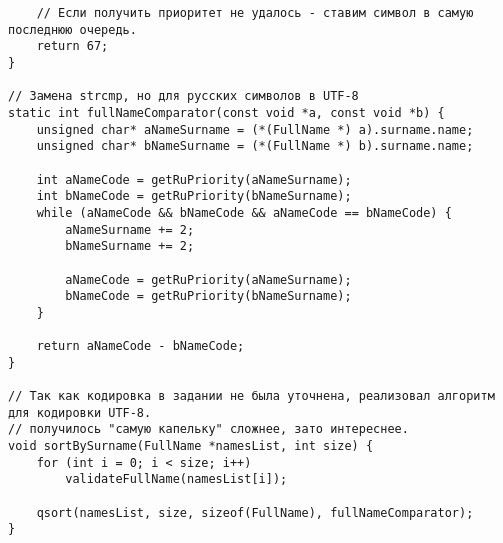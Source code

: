 \documentclass[a4paper, 12pt, oneside]{article}
\begin{document}
\begin{verbatim}
    // Если получить приоритет не удалось - ставим символ в самую последнюю очередь.
    return 67;
}

// Замена strcmp, но для русских символов в UTF-8
static int fullNameComparator(const void *a, const void *b) {
    unsigned char* aNameSurname = (*(FullName *) a).surname.name;
    unsigned char* bNameSurname = (*(FullName *) b).surname.name;

    int aNameCode = getRuPriority(aNameSurname);
    int bNameCode = getRuPriority(bNameSurname);
    while (aNameCode && bNameCode && aNameCode == bNameCode) {
        aNameSurname += 2;
        bNameSurname += 2;

        aNameCode = getRuPriority(aNameSurname);
        bNameCode = getRuPriority(bNameSurname);
    }

    return aNameCode - bNameCode;
}

// Так как кодировка в задании не была уточнена, реализовал алгоритм для кодировки UTF-8.
// получилось "самую капельку" сложнее, зато интереснее.
void sortBySurname(FullName *namesList, int size) {
    for (int i = 0; i < size; i++)
        validateFullName(namesList[i]);

    qsort(namesList, size, sizeof(FullName), fullNameComparator);
}
    \end{verbatim}
\end{document}
